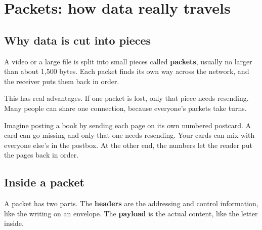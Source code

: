 \chapter{Packets: how data really travels}

\section{Why data is cut into pieces}
A video or a large file is split into small pieces called \textbf{packets}, usually no larger than about 1,500 bytes. Each packet finds its own way across the network, and the receiver puts them back in order.

This has real advantages. If one packet is lost, only that piece needs resending. Many people can share one connection, because everyone's packets take turns.

\begin{analogy}
Imagine posting a book by sending each page on its own numbered postcard. A card can go missing and only that one needs resending. Your cards can mix with everyone else's in the postbox. At the other end, the numbers let the reader put the pages back in order.
\end{analogy}

\section{Inside a packet}
A packet has two parts. The \textbf{headers} are the addressing and control information, like the writing on an envelope. The \textbf{payload} is the actual content, like the letter inside.

